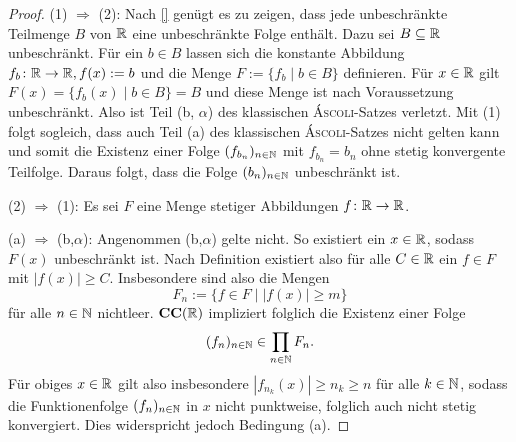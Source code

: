 \begin{proof}
  (1) $\Rightarrow$ (2):
  Nach \ref{} genügt es zu zeigen, dass jede unbeschränkte Teilmenge $B$ von $\mathbb{R}$ eine unbeschränkte Folge enthält.
  Dazu sei $B \subseteq \mathbb{R}$ unbeschränkt.
  Für ein $b \in B$ lassen sich die konstante Abbildung $f_b \colon \mathbb{R} \to \mathbb{R}, f(x):= b$ und die Menge $F := \{f_b \mid b \in B\}$ definieren.
  Für $x \in \mathbb{R}$ gilt $F(x) = \{f_b(x) \mid b \in B\} = B$ und diese Menge ist nach Voraussetzung unbeschränkt.
  Also ist Teil (b, $\alpha$) des klassischen \textsc{Áscoli}-Satzes verletzt.
  Mit (1) folgt sogleich, dass auch Teil (a) des klassischen \textsc{Áscoli}-Satzes nicht gelten kann und somit die Existenz einer Folge $(f_{b_n})_{n \in \mathbb{N}}$ mit $f_{b_n} = b_n$ ohne stetig konvergente Teilfolge.
  Daraus folgt, dass die Folge $(b_n)_{n \in \mathbb{N}}$ unbeschränkt ist.

  (2) $\Rightarrow$ (1):
  Es sei $F$ eine Menge stetiger Abbildungen $f \colon \mathbb{R} \to \mathbb{R}$.

  (a) $\Rightarrow$ (b,$\alpha$):
  Angenommen (b,$\alpha$) gelte nicht. So existiert ein $x \in \mathbb{R}$, sodass $F(x)$ unbeschränkt ist.
  Nach Definition existiert also für alle $C \in \mathbb{R}$ ein $f \in F$ mit $|f(x)| \geq C$.
  Insbesondere sind also die Mengen 
  \begin{displaymath}
    F_n := \{ f \in F \mid |f(x)| \geq m \}
  \end{displaymath}
  für alle $n \in \mathbb{N}$ nichtleer.
  $\mathbf{CC}(\mathbb{R})$ impliziert folglich die Existenz einer Folge 
  \begin{displaymath}
    (f_n)_{n \in \mathbb{N}} \in \prod_{n \in \mathbb{N}} F_n.
  \end{displaymath}
  Für obiges $x \in \mathbb{R}$ gilt also insbesondere $|f_{n_k}(x)| \geq n_k \geq n$ für alle $k \in \mathbb{N}$, sodass die Funktionenfolge $(f_n)_{n \in \mathbb{N}}$ in $x$ nicht punktweise, folglich auch nicht stetig konvergiert.
  Dies widerspricht jedoch Bedingung (a).


\end{proof}
